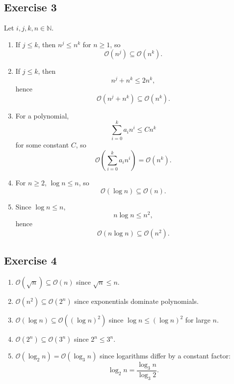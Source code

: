 \documentclass{article}
\theoremstyle{theorem}
\theoremstyle{definition}
\theoremstyle{remark}
\begin{document}
\subsection*{Exercise 3}

Let $i,j,k,n \in \mathbb{N}$.

\begin{enumerate}
    \item If $j \leq k$, then $n^j \leq n^k$ for $n \geq 1$, so
    \[
    \mathcal{O}(n^j) \subseteq \mathcal{O}(n^k).
    \]

    \item If $j \leq k$, then
    \[
    n^j + n^k \leq 2n^k,
    \]
    hence
    \[
    \mathcal{O}(n^j + n^k) \subseteq \mathcal{O}(n^k).
    \]

    \item For a polynomial,
    \[
    \sum_{i=0}^k a_i n^i \leq C n^k
    \]
    for some constant $C$, so
    \[
    \mathcal{O}\left(\sum_{i=0}^k a_i n^i\right) = \mathcal{O}(n^k).
    \]

    \item For $n \geq 2$, $\log n \leq n$, so
    \[
    \mathcal{O}(\log n) \subseteq \mathcal{O}(n).
    \]

    \item Since $\log n \leq n$,
    \[
    n \log n \leq n^2,
    \]
    hence
    \[
    \mathcal{O}(n \log n) \subseteq \mathcal{O}(n^2).
    \]
\end{enumerate}

\subsection*{Exercise 4}

\begin{enumerate}
    \item $\mathcal{O}(\sqrt{n}) \subseteq \mathcal{O}(n)$ since $\sqrt{n} \leq n$.

    \item $\mathcal{O}(n^2) \subseteq \mathcal{O}(2^n)$ since exponentials dominate polynomials.

    \item $\mathcal{O}(\log n) \subseteq \mathcal{O}((\log n)^2)$ since $\log n \leq (\log n)^2$ for large $n$.

    \item $\mathcal{O}(2^n) \subseteq \mathcal{O}(3^n)$ since $2^n \leq 3^n$.

    \item $\mathcal{O}(\log_2 n) = \mathcal{O}(\log_3 n)$ since logarithms differ by a constant factor:
    \[
    \log_2 n = \frac{\log_3 n}{\log_3 2}.
    \]
\end{enumerate}
\end{document}
